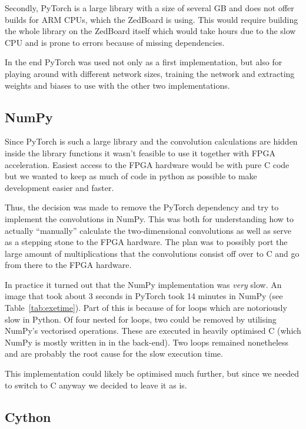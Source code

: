 \documentclass[
			fontsize = 12pt,
			paper = a4
			]
			{scrartcl}%
\newcommand{\?}{\ensuremath{^\texttt{\textbf [CITATION~NEEDED]}}}
\begin{document}
Secondly, PyTorch is a large library with a size of several GB and does not offer builds for ARM CPUs, which the ZedBoard is using. This would require building the whole library on the ZedBoard itself which would take hours due to the slow CPU and is prone to errors because of missing dependencies.

In the end PyTorch was used not only as a first implementation, but also for playing around with different network sizes, training the network and extracting weights and biases to use with the other two implementations.

\subsection{NumPy}
\label{sec:Numpy}

Since PyTorch is such a large library and the convolution calculations are hidden inside the library functions it wasn't feasible to use it together with FPGA acceleration. Easiest access to the FPGA hardware would be with pure C code but we wanted to keep as much of code in python as possible to make development easier and faster. 

Thus, the decision was made to remove the PyTorch dependency and try to implement the convolutions in NumPy. This was both for understanding how to actually \enquote{manually} calculate the two-dimensional convolutions as well as serve as a stepping stone to the FPGA hardware. The plan was to possibly port the large amount of multiplications that the convolutions consist off over to C and go from there to the FPGA hardware.

In practice it turned out that the NumPy implementation was \emph{very} slow. An image that took about 3 seconds in PyTorch took 14 minutes in NumPy (see Table~\ref{tab:exetime}). Part of this is because of for loops which are notoriously slow in Python. Of four nested for loops, two could be removed by utilising NumPy's vectorised operations. These are executed in heavily optimised C (which NumPy is mostly written in in the back-end). Two loops remained nonetheless and are probably the root cause for the slow execution time.

This implementation could likely be optimised much further, but since we needed to switch to C anyway we decided to leave it as is.

\subsection{Cython}
\label{sec:cython}
\end{document}
